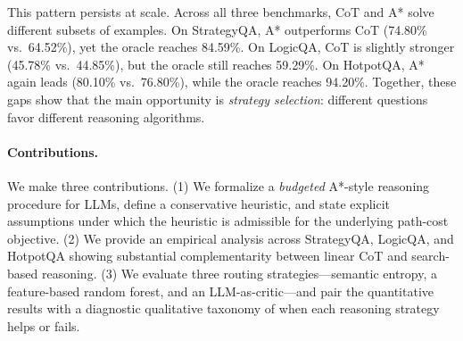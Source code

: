 \documentclass[11pt]{article}
\begin{document}
This pattern persists at scale. Across all three benchmarks, CoT and A* solve different subsets of examples. On StrategyQA, A* outperforms CoT (74.80\% vs.\ 64.52\%), yet the oracle reaches 84.59\%. On LogicQA, CoT is slightly stronger (45.78\% vs.\ 44.85\%), but the oracle still reaches 59.29\%. On HotpotQA, A* again leads (80.10\% vs.\ 76.80\%), while the oracle reaches 94.20\%. Together, these gaps show that the main opportunity is \emph{strategy selection}: different questions favor different reasoning algorithms.

\paragraph{Contributions.}
We make three contributions. (1) We formalize a \emph{budgeted} A*-style reasoning procedure for LLMs, define a conservative heuristic, and state explicit assumptions under which the heuristic is admissible for the underlying path-cost objective. (2) We provide an empirical analysis across StrategyQA, LogicQA, and HotpotQA showing substantial complementarity between linear CoT and search-based reasoning. (3) We evaluate three routing strategies---semantic entropy, a feature-based random forest, and an LLM-as-critic---and pair the quantitative results with a diagnostic qualitative taxonomy of when each reasoning strategy helps or fails.



\end{document}
